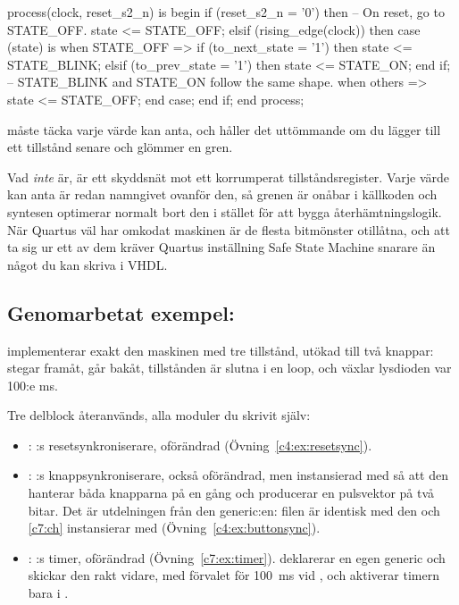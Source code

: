 \begin{vhdlcode}
process(clock, reset_s2_n) is
begin
    if (reset_s2_n = '0') then
        -- On reset, go to STATE_OFF.
        state <= STATE_OFF;
    elsif (rising_edge(clock)) then
        case (state) is
            when STATE_OFF =>
                if (to_next_state = '1') then
                    state <= STATE_BLINK;
                elsif (to_prev_state = '1') then
                    state <= STATE_ON;
                end if;
            -- STATE_BLINK and STATE_ON follow the same shape.
            when others =>
                state <= STATE_OFF;
        end case;
    end if;
end process;
\end{vhdlcode}

 måste täcka varje värde  kan anta, och
 håller det uttömmande om du lägger till ett tillstånd senare och glömmer en gren.

Vad  \emph{inte} är, är ett skyddsnät mot ett korrumperat tillståndsregister.
Varje värde  kan anta är redan namngivet ovanför den, så grenen är onåbar i källkoden
och syntesen optimerar normalt bort den i stället för att bygga återhämtningslogik. När Quartus väl
har omkodat maskinen är de flesta bitmönster otillåtna, och att ta sig ur ett av dem kräver Quartus
inställning Safe State Machine snarare än något du kan skriva i VHDL.

\subsection*{Genomarbetat exempel: }
 implementerar exakt den maskinen med tre tillstånd, utökad till två knappar:
 stegar framåt,  går bakåt, tillstånden är slutna i en loop, och
 växlar lysdioden var 100:e ms.

Tre delblock återanvänds, alla moduler du skrivit själv:
\begin{itemize}
  \item {}: :s resetsynkroniserare, oförändrad
    (Övning~\ref{c4:ex:resetsync}).
  \item {}: :s knappsynkroniserare, också oförändrad, men
    instansierad med  så att den hanterar båda knapparna på en gång och
    producerar en pulsvektor på två bitar. Det är utdelningen från den generic:en: filen är
    identisk med den  och \ref{c7:ch} instansierar med 
    (Övning~\ref{c4:ex:buttonsync}).
  \item {}: :s timer, oförändrad (Övning~\ref{c7:ex:timer}).
     deklarerar en egen generic  och skickar den rakt vidare,
    med förvalet  för 100~ms vid , och aktiverar timern bara i
    .
\end{itemize}

